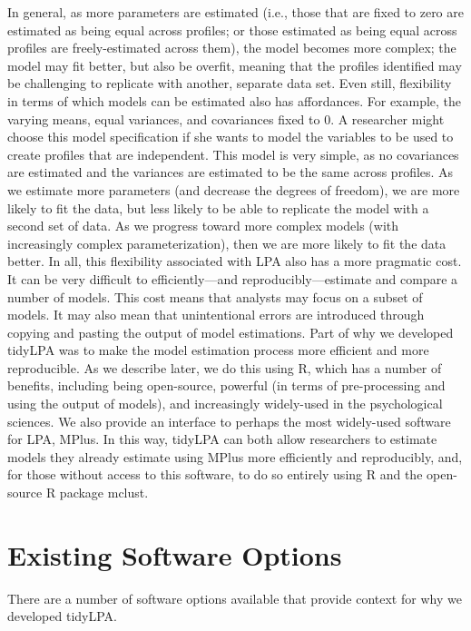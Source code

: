 \documentclass[man]{apa6}
\begin{document}
In general, as more parameters are estimated (i.e., those that are fixed to zero
are estimated as being equal across profiles; or those estimated as being equal
across profiles are freely-estimated across them), the model becomes more
complex; the model may fit better, but also be overfit, meaning that the
profiles identified may be challenging to replicate with another, separate data
set. Even still, flexibility in terms of which models can be estimated also has
affordances. For example, the varying means, equal variances, and covariances
fixed to 0. A researcher might choose this model specification if she wants to
model the variables to be used to create profiles that are independent. This
model is very simple, as no covariances are estimated and the variances are
estimated to be the same across profiles. As we estimate more parameters (and
decrease the degrees of freedom), we are more likely to fit the data, but less
likely to be able to replicate the model with a second set of data. As we
progress toward more complex models (with increasingly complex
parameterization), then we are more likely to fit the data better.
In all, this flexibility associated with LPA also has a more pragmatic cost. It
can be very difficult to efficiently---and reproducibly---estimate and compare a
number of models. This cost means that analysts may focus on a subset of models.
It may also mean that unintentional errors are introduced through copying and
pasting the output of model estimations. Part of why we developed tidyLPA was to
make the model estimation process more efficient and more reproducible. As we
describe later, we do this using R, which has a number of benefits, including
being open-source, powerful (in terms of pre-processing and using the output of
models), and increasingly widely-used in the psychological sciences. We also
provide an interface to perhaps the most widely-used software for LPA, MPlus. In
this way, tidyLPA can both allow researchers to estimate models they already
estimate using MPlus more efficiently and reproducibly, and, for those without
access to this software, to do so entirely using R and the open-source R package
mclust.

\hypertarget{existing-software-options}{%
\section{Existing Software Options}\label{existing-software-options}}

There are a number of software options available that provide context for why we
developed tidyLPA.
\end{document}
